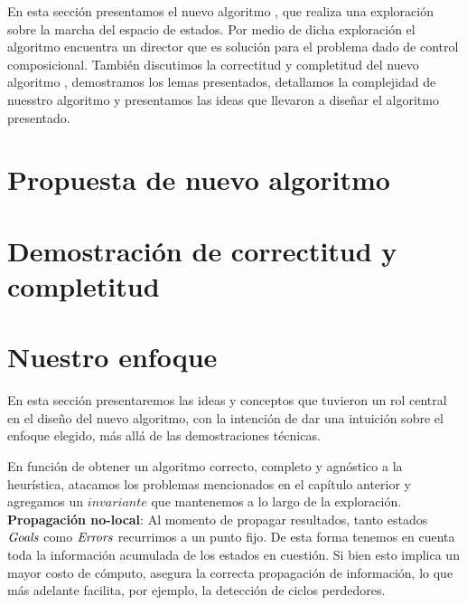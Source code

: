 
En esta sección presentamos el nuevo algoritmo \DCS, que realiza una exploración sobre la marcha del espacio de estados. Por medio de dicha exploración el algoritmo encuentra un director que es solución para el problema dado de control composicional. También discutimos la correctitud y completitud del nuevo algoritmo \DCS, demostramos los lemas presentados, detallamos la complejidad de nuesstro algoritmo y presentamos las ideas que llevaron a diseñar el algoritmo presentado. \\

\section{Propuesta de nuevo algoritmo}



\FloatBarrier

\section{Demostración de correctitud y completitud}


\section{Nuestro enfoque}

En esta sección presentaremos las ideas y conceptos que tuvieron un rol central en el diseño del nuevo algoritmo, con la intención de dar una intuición sobre el enfoque elegido, más allá de las demostraciones técnicas.

En función de obtener un algoritmo correcto, completo y agnóstico a la heurística, atacamos los problemas mencionados en el capítulo anterior y agregamos un $invariante$ que mantenemos a lo largo de la exploración.\\

\textbf{Propagación no-local}: Al momento de propagar resultados, tanto estados $\mathit{Goals}$ como $\mathit{Errors}$ recurrimos a un punto fijo. De esta forma tenemos en cuenta toda la información acumulada de los estados en cuestión. Si bien esto implica un mayor costo de cómputo, asegura la correcta propagación de información, lo que más adelante facilita, por ejemplo, la detección de ciclos perdedores.\\

